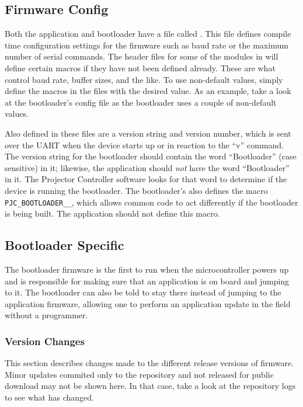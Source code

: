 \documentclass{article}
\begin{document}
\subsection{Firmware Config} \label{ssec:FWConfig}
Both the application and bootloader have a file called .  This file defines
compile time configuration settings for the firmware such as baud rate or the maximum number of
serial commands.  The header files for some of the modules in  will define
certain macros if they have not been defined already.  These are what control baud rate, buffer
sizes, and the like.  To use non-default values, simply define the macros in the 
files with the desired value.  As an example, take a look at the bootloader's config file
 as the bootloader uses a couple of non-default values.

Also defined in these files are a version string and version number, which is sent over the UART
when the device starts up or in reaction to the ``v'' command.  The version string for the
bootloader should contain the word ``Bootloader'' (case sensitive) in it; likewise, the application
should \emph{not} have the word ``Bootloader'' in it.  The Projector Controller software looks for
that word to determine if the device is running the bootloader.
The bootloader's  also defines the macro \texttt{PJC\_BOOTLOADER\_\_}, which allows
common code to act differently if the bootloader is being built.  The application should not define
this macro.

\subsection{Bootloader Specific} \label{ssec:FWBootloader}
The bootloader firmware is the first to run when the microcontroller powers up and is responsible
for making sure that an application is on board and jumping to it.  The bootloader can also be told
to stay there instead of jumping to the application firmware, allowing one to perform an application
update in the field without a programmer.

\subsubsection{Version Changes} \label{sssec:FWBootChanges}
This section describes changes made to the different release versions of firmware.  Minor updates
commited only to the repository and not released for public download may not be shown here.  In that
case, take a look at the repository logs to see what has changed.
\end{document}
